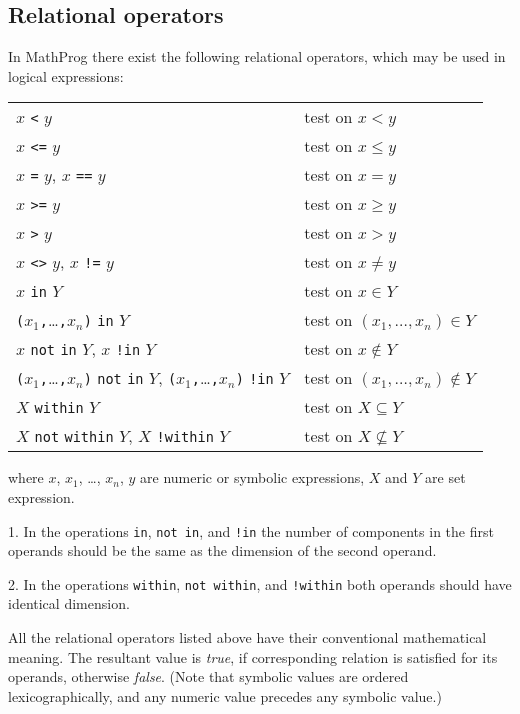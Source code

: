 \documentclass[11pt]{report}
\begin{document}
\vspace*{-8pt}

\subsection{Relational operators}

In MathProg there exist the following relational operators, which may
be used in logical expressions:

\begin{tabular}{@{}ll@{}}
$x$ {\tt<} $y$&test on $x<y$\\
$x$ {\tt<=} $y$&test on $x\leq y$\\
$x$ {\tt=} $y$, $x$ {\tt==} $y$&test on $x=y$\\
$x$ {\tt>=} $y$&test on $x\geq y$\\
$x$ {\tt>} $y$&test on $x>y$\\
$x$ {\tt<>} $y$, $x$ {\tt!=} $y$&test on $x\neq y$\\
$x$ {\tt in} $Y$&test on $x\in Y$\\
{\tt(}$x_1${\tt,}\dots{\tt,}$x_n${\tt)} {\tt in} $Y$&test on
$(x_1,\dots,x_n)\in Y$\\
$x$ {\tt not} {\tt in} $Y$, $x$ {\tt!in} $Y$&test on $x\not\in Y$\\
{\tt(}$x_1${\tt,}\dots{\tt,}$x_n${\tt)} {\tt not} {\tt in} $Y$,
{\tt(}$x_1${\tt,}\dots{\tt,}$x_n${\tt)} {\tt !in} $Y$&test on
$(x_1,\dots,x_n)\not\in Y$\\
$X$ {\tt within} $Y$&test on $X\subseteq Y$\\
$X$ {\tt not} {\tt within} $Y$, $X$ {\tt !within} $Y$&test on
$X\not\subseteq Y$\\
\end{tabular}

\noindent where $x$, $x_1$, \dots, $x_n$, $y$ are numeric or symbolic
expressions, $X$ and $Y$ are set expression.

\newpage

1. In the operations {\tt in}, {\tt not in}, and {\tt !in} the
number of components in the first operands should be the same as the
dimension of the second operand.

2. In the operations {\tt within}, {\tt not within}, and {\tt !within}
both operands should have identical dimension.

All the relational operators listed above have their conventional
mathematical meaning. The resultant value is {\it true}, if
corresponding relation is satisfied for its operands, otherwise
{\it false}. (Note that symbolic values are ordered lexicographically,
and any numeric value precedes any symbolic value.)
\end{document}
